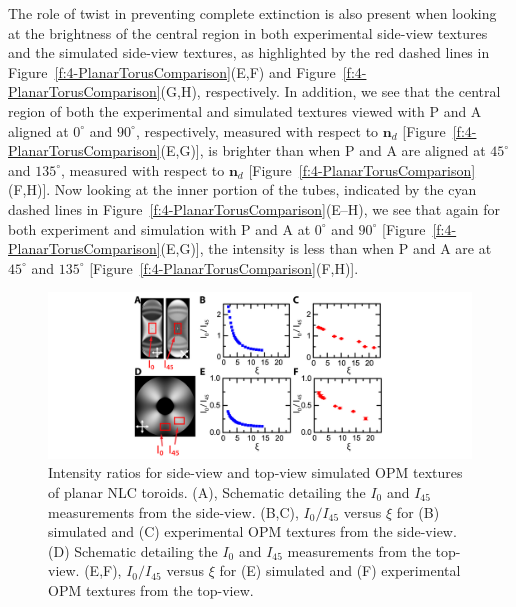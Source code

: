 The role of twist in preventing complete extinction is also present when looking at the brightness of the central region in both experimental side-view textures and the simulated side-view textures, as highlighted by the red dashed lines in Figure~\ref{f:4-PlanarTorusComparison}(E,F) and Figure~\ref{f:4-PlanarTorusComparison}(G,H), respectively.
In addition, we see that the central region of both the experimental and simulated textures viewed with P and A aligned at $0^{\circ}$ and $90^{\circ}$, respectively, measured with respect to $\mathbf{n}_d$ [Figure~\ref{f:4-PlanarTorusComparison}(E,G)], is brighter than when P and A are aligned at $45^{\circ}$ and $135^{\circ}$, measured with respect to $\mathbf{n}_d$ [Figure~\ref{f:4-PlanarTorusComparison}(F,H)].
Now looking at the inner portion of the tubes, indicated by the cyan dashed lines in Figure~\ref{f:4-PlanarTorusComparison}(E--H), we see that again for both experiment and simulation with P and A at $0^{\circ}$ and $90^{\circ}$ [Figure~\ref{f:4-PlanarTorusComparison}(E,G)], the intensity is less than when P and A are at $45^{\circ}$ and $135^{\circ}$ [Figure~\ref{f:4-PlanarTorusComparison}(F,H)].
\begin{figure}
\centering
\includegraphics{figures/C4/Ch4-Figs_PlanarSimIntRat.png}
\caption{Intensity ratios for side-view and top-view simulated OPM textures of planar NLC toroids.
(A), Schematic detailing the $I_0$ and $I_{45}$ measurements from the side-view.
(B,C), $I_0/I_{45}$ versus $\xi$ for (B) simulated and (C) experimental OPM textures from the side-view.
(D) Schematic detailing the $I_0$ and $I_{45}$ measurements from the top-view.
(E,F), $I_0/I_{45}$ versus $\xi$ for (E) simulated and (F) experimental OPM textures from the top-view. }\label{f:4-PlanarIntRatio}
\end{figure}

